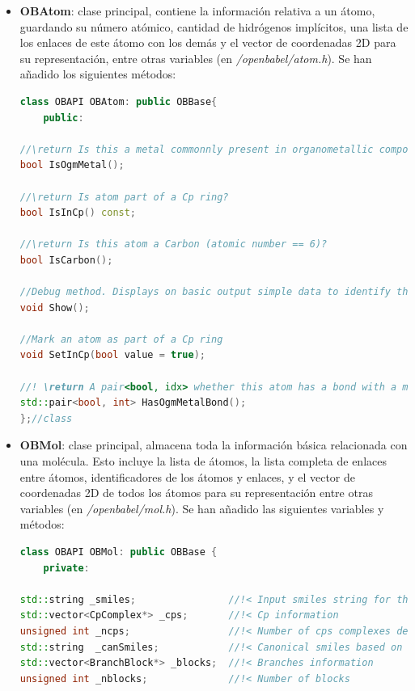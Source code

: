 \begin{itemize}
    \item \textbf{OBAtom}: clase principal, contiene la información relativa a un átomo, guardando su número atómico, cantidad de hidrógenos implícitos, una lista de los enlaces de este átomo con los demás y el vector de coordenadas 2D para su representación, entre otras variables (en \textit{/openbabel/atom.h}). Se han añadido los siguientes métodos:
    \begin{lstlisting}[language=C++]
class OBAPI OBAtom: public OBBase{
    public: 
    
//\return Is this a metal commonnly present in organometallic compounds?
bool IsOgmMetal();

//\return Is atom part of a Cp ring?
bool IsInCp() const;

//\return Is this atom a Carbon (atomic number == 6)?
bool IsCarbon();

//Debug method. Displays on basic output simple data to identify the atom
void Show();

//Mark an atom as part of a Cp ring
void SetInCp(bool value = true);

//! \return A pair<bool, idx> whether this atom has a bond with a metal atom. If true, also returns metal idx
std::pair<bool, int> HasOgmMetalBond();
};//class
    \end{lstlisting}


    \item \textbf{OBMol}: clase principal, almacena toda la información básica relacionada con una molécula. Esto incluye la lista de átomos, la lista completa de enlaces entre átomos, identificadores de los átomos y enlaces, y el vector de coordenadas 2D de todos los átomos para su representación entre otras variables (en \textit{/openbabel/mol.h}). Se han añadido las siguientes variables y métodos:
    \begin{lstlisting}[language=C++]
class OBAPI OBMol: public OBBase {
    private: 
    
std::string _smiles;                //!< Input smiles string for the molecule
std::vector<CpComplex*> _cps;       //!< Cp information
unsigned int _ncps;                 //!< Number of cps complexes detected
std::string  _canSmiles;            //!< Canonical smiles based on Ogm canonicalization
std::vector<BranchBlock*> _blocks;  //!< Branches information
unsigned int _nblocks;              //!< Number of blocks



\end{lstlisting}
\end{itemize}
